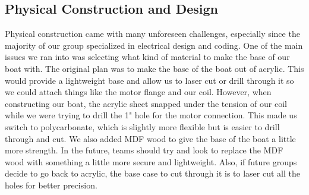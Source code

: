 \subsection{Physical Construction and Design}
Physical construction came with many unforeseen challenges, especially since the majority of our group specialized in electrical design and coding. One of the main issues we ran into was selecting what kind of material to make the base of our boat with. The original plan was to make the base of the boat out of acrylic. This would provide a lightweight base and allow us to laser cut or drill through it so we could attach things like the motor flange and our coil. However, when constructing our boat, the acrylic sheet snapped under the tension of our coil while we were trying to drill the 1" hole for the motor connection. This made us switch to polycarbonate, which is slightly more flexible but is easier to drill through and cut. We also added MDF wood to give the base of the boat a little more strength. In the future, teams should try and look to replace the MDF wood with something a little more secure and lightweight. Also, if future groups decide to go back to acrylic, the base case to cut through it is to laser cut all the holes for better precision. 